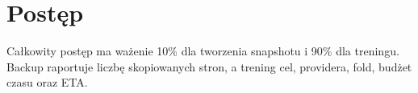 \documentclass[11pt,a4paper]{article}
\begin{document}
\section{Postęp}
Całkowity postęp ma ważenie 10\% dla tworzenia snapshotu i 90\% dla treningu.
Backup raportuje liczbę skopiowanych stron, a trening cel, providera, fold,
budżet czasu oraz ETA.
\end{document}
